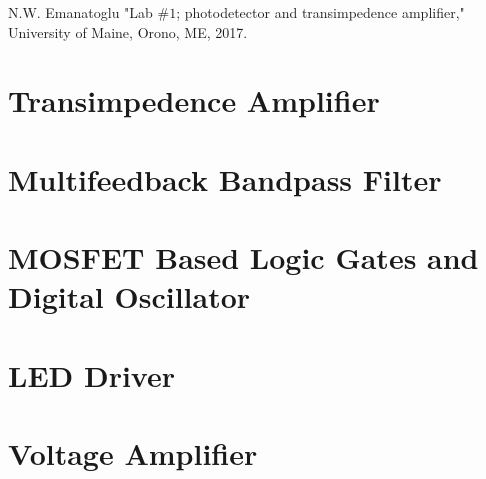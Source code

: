 \documentclass{article}
\begin{document}
 
    
    \newpage
\clearpage

\appendix

\begin{thebibliography}{00}



 N.W. Emanatoglu "Lab $\#1$; photodetector and transimpedence amplifier," University of Maine, Orono, ME, 2017.
\newline

\newpage


\end{thebibliography}

\begin{appendices}

\section{Transimpedence Amplifier}
	

\section{Multifeedback Bandpass Filter}
	

\section{MOSFET Based Logic Gates and Digital Oscillator}


\section{LED Driver}
	

\section{Voltage Amplifier}
		



\end{appendices}
\end{document}
